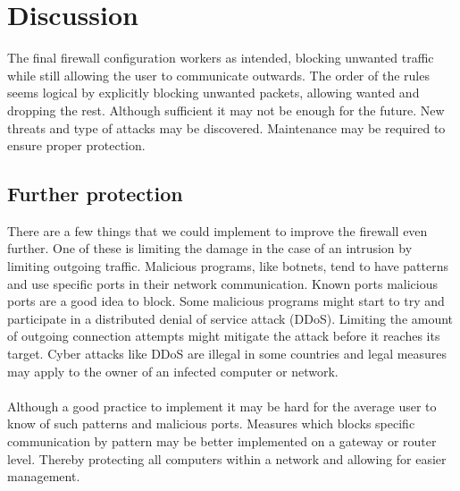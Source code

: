 \section{Discussion} 
\label{sec:discussion}

The final firewall configuration workers as intended, blocking unwanted traffic while still allowing the user to communicate outwards. The order of the rules seems logical by explicitly blocking unwanted packets, allowing wanted and dropping the rest. Although sufficient it may not be enough for the future. New threats and type of attacks may be discovered. Maintenance may be required to ensure proper protection.


\subsection{Further protection}
There are a few things that we could implement to improve the firewall even further. One of these is limiting the damage in the case of an intrusion by limiting outgoing traffic. Malicious programs, like botnets, tend to have patterns and use specific ports in their network communication. Known ports malicious ports are a good idea to block. Some malicious programs might start to try and participate in a distributed denial of service attack (DDoS). Limiting the amount of outgoing connection attempts might mitigate the attack before it reaches its target. Cyber attacks like DDoS are illegal in some countries and legal measures may apply to the owner of an infected computer or network.\\
\\
Although a good practice to implement it may be hard for the average user to know of such patterns and malicious ports. Measures which blocks specific communication by pattern may be better implemented on a gateway or router level. Thereby protecting all computers within a network and allowing for easier management.

